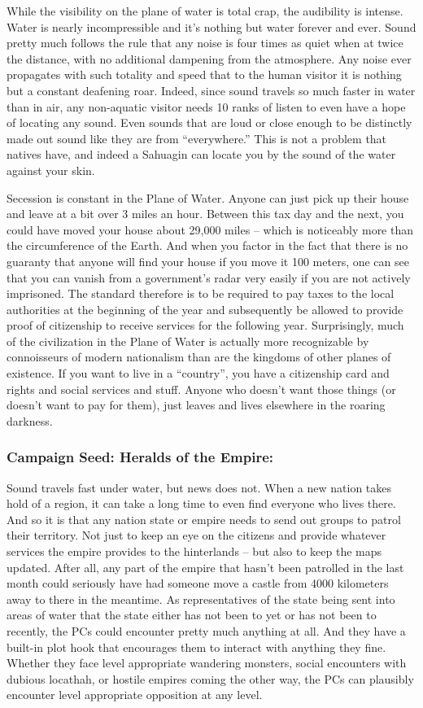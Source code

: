 While the visibility on the plane of water is total crap, the audibility is intense. Water is nearly incompressible and it's nothing but water forever and ever. Sound pretty much follows the rule that any noise is four times as quiet when at twice the distance, with no additional dampening from the atmosphere. Any noise ever propagates with such totality and speed that to the human visitor it is nothing but a constant deafening roar. Indeed, since sound travels so much faster in water than in air, any non-aquatic visitor needs 10 ranks of listen to even have a hope of locating any sound. Even sounds that are loud or close enough to be distinctly made out sound like they are from “everywhere.” This is not a problem that natives have, and indeed a Sahuagin can locate you by the sound of the water against your skin.

Secession is constant in the Plane of Water. Anyone can just pick up their house and leave at a bit over 3 miles an hour. Between this tax day and the next, you could have moved your house about 29,000 miles – which is noticeably more than the circumference of the Earth. And when you factor in the fact that there is no guaranty that anyone will find your house if you move it 100 meters, one can see that you can vanish from a government's radar very easily if you are not actively imprisoned. The standard therefore is to be required to pay taxes to the local authorities at the beginning of the year and subsequently be allowed to provide proof of citizenship to receive services for the following year. Surprisingly, much of the civilization in the Plane of Water is actually more recognizable by connoisseurs of modern nationalism than are the kingdoms of other planes of existence. If you want to live in a “country”, you have a citizenship card and rights and social services and stuff. Anyone who doesn't want those things (or doesn't want to pay for them), just leaves and lives elsewhere in the roaring darkness.

\subsubsection{Campaign Seed: Heralds of the Empire:} Sound travels fast under water, but news does not. When a new nation takes hold of a region, it can take a long time to even find everyone who lives there. And so it is that any nation state or empire needs to send out groups to patrol their territory. Not just to keep an eye on the citizens and provide whatever services the empire provides to the hinterlands – but also to keep the maps updated. After all, any part of the empire that hasn't been patrolled in the last month could seriously have had someone move a castle from 4000 kilometers away to there in the meantime. As representatives of the state being sent into areas of water that the state either has not been to yet or has not been to recently, the PCs could encounter pretty much anything at all. And they have a built-in plot hook that encourages them to interact with anything they fine. Whether they face level appropriate wandering monsters, social encounters with dubious locathah, or hostile empires coming the other way, the PCs can plausibly encounter level appropriate opposition at any level.

